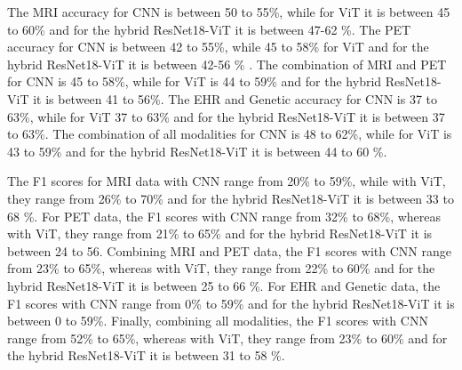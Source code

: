 The MRI accuracy for CNN is between 50 to 55\%, while for ViT it is between 45 to 60\% and for the hybrid ResNet18-ViT it is between 47-62 \%. The PET accuracy for CNN is between 42 to 55\%, while 45 to 58\% for ViT and for the hybrid ResNet18-ViT it is between 42-56 \% . The combination of MRI and PET for CNN is 45 to 58\%, while for ViT is 44 to 59\% and for the hybrid ResNet18-ViT it is between 41 to 56\%. The EHR and Genetic accuracy for CNN is 37 to 63\%, while for ViT 37 to 63\% and for the hybrid ResNet18-ViT it is between 37 to 63\%. The combination of all modalities for CNN is 48 to 62\%, while for ViT is 43 to 59\% and for the hybrid ResNet18-ViT it is between 44 to 60 \%.  

The F1 scores for MRI data with CNN range from 20\% to 59\%, while with ViT, they range from 26\% to 70\% and for the hybrid ResNet18-ViT it is between 33 to 68 \%. For PET data, the F1 scores with CNN range from 32\% to 68\%, whereas with ViT, they range from 21\% to 65\% and for the hybrid ResNet18-ViT it is between 24 to 56. Combining MRI and PET data, the F1 scores with CNN range from 23\% to 65\%, whereas with ViT, they range from 22\% to 60\% and for the hybrid ResNet18-ViT it is between 25 to 66 \%. For EHR and Genetic data, the F1 scores with CNN range from 0\% to 59\%  and for the hybrid ResNet18-ViT it is between 0 to 59\%. Finally, combining all modalities, the F1 scores with CNN range from 52\% to 65\%, whereas with ViT, they range from 23\% to 60\% and for the hybrid ResNet18-ViT it is between 31 to 58 \%. 


